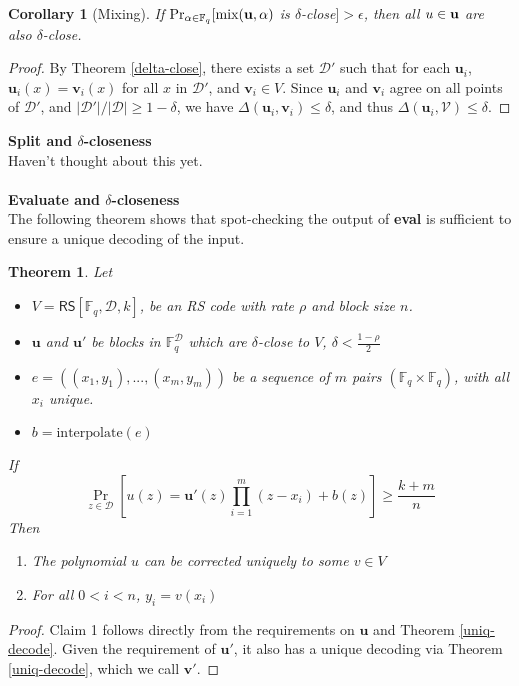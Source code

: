 \documentclass[10pt,letterpaper,titlepage]{article}
\newcommand{\GF}[1]{\mathbb{F}_{#1}}
\newcommand{\p}[0]{\rho}
\newcommand{\dd}[0]{\delta}
\newcommand{\e}[0]{\epsilon}
\newcommand{\D}[0]{\mathcal{D}}
\newtheorem{theorem}{Theorem}
\newtheorem{corollary}{Corollary}
\theoremstyle{definition}
\begin{document}
\begin{appendices}
\begin{corollary}[Mixing]
  If $\Pr_{\alpha \in \GF{q}}[\textrm{mix}(\bold{u}, \alpha)$ is $\dd$-close$] > \e$,
  then all $u \in \bold{u}$ are also $\dd$-close.
\end{corollary}
\begin{proof}
  By Theorem \ref*{delta-close}, there exists a set $\D'$ such that for each $\mathbf{u}_i$, $\mathbf{u}_i(x) = \mathbf{v}_i(x)$ for all $x$ in $\D'$, and $\mathbf{v}_i \in V$.
  Since $\mathbf{u}_i$ and $\mathbf{v}_i$ agree on all points of $\D'$, and $|\D'|/|\D| \ge 1 - \delta$, we have $\Delta(\mathbf{u}_i, \mathbf{v}_i) \le \dd$, and thus $\Delta(\mathbf{u}_i, \mathcal{V}) \le \dd$.
\end{proof}
\noindent
\textbf{Split and $\delta$-closeness}\\
Haven't thought about this yet.\\
\\
\textbf{Evaluate and $\delta$-closeness}\\
The following theorem shows that spot-checking the output of \textbf{eval} is sufficient to ensure a unique decoding of the input.
\begin{theorem}
  Let
  \begin{itemize}
    \item $V = \mathsf{RS}[\GF{q}, \D, k]$, be an RS code with rate $\p$ and block size $n$.
    \item $\mathbf{u}$ and $\mathbf{u'}$ be blocks in $\GF{q}^{\D}$ which are $\dd$-close to $V$, $\dd < \frac{1 - \p}{2}$
    \item $e =((x_1, y_1), ..., (x_m, y_m))$ be a sequence of $m$ pairs $(\GF{q} \times \GF{q})$, with all $x_i$ unique.
    \item $b = \textrm{interpolate}(e)$
  \end{itemize}
  If \begin{equation}
    \Pr_{z \in \D}[u(z) = \mathbf{u'}(z) \prod_{i=1}^{m} (z - x_i) + b(z)] \ge \frac{k+m}{n}
  \end{equation}
  Then
  \begin{enumerate}
    \item The polynomial $u$ can be corrected uniquely to some $v \in V$
    \item For all $0 < i < n$, $y_i = v(x_i)$
  \end{enumerate}
\end{theorem}
\begin{proof}
  Claim 1 follows directly from the requirements on $\mathbf{u}$ and Theorem \ref{uniq-decode}.
  Given the requirement of $\mathbf{u'}$, it also has a unique decoding via Theorem \ref{uniq-decode}, which we call $\mathbf{v'}$.


\end{proof}
\end{appendices}
\end{document}
